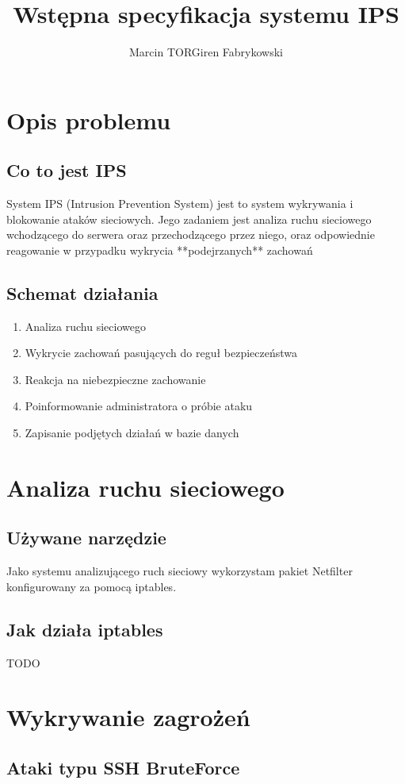 \documentclass[a4paper,10pt]{article}
\author{Marcin TORGiren Fabrykowski}
\title{Wstępna specyfikacja systemu IPS}
\begin{document}
\maketitle
\newpage
\tableofcontents
\newpage
\section{Opis problemu}
	\subsection{Co to jest IPS}
		System IPS (Intrusion Prevention System) jest to system wykrywania i blokowanie ataków sieciowych.
		Jego zadaniem jest analiza ruchu sieciowego wchodzącego do serwera oraz przechodzącego przez niego, oraz odpowiednie reagowanie w przypadku wykrycia **podejrzanych** zachowań
	\subsection{Schemat działania}
		\begin{enumerate}
		\item Analiza ruchu sieciowego
		\item Wykrycie zachowań pasujących do reguł bezpieczeństwa
		\item Reakcja na niebezpieczne zachowanie
		\item Poinformowanie administratora o próbie ataku
		\item Zapisanie podjętych działań w bazie danych
		\end{enumerate}
\section{Analiza ruchu sieciowego}
	\subsection{Używane narzędzie}
		Jako systemu analizującego ruch sieciowy wykorzystam pakiet Netfilter konfigurowany za pomocą iptables.
	\subsection{Jak działa iptables}
		TODO
\section{Wykrywanie zagrożeń}
	\subsection{Ataki typu SSH BruteForce}
\end{document}
